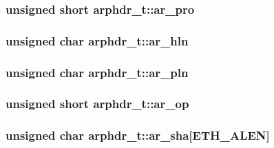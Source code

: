 \hypertarget{structarphdr__t_19ad78d51db8ab6940c913769f8afe81}{
\subsubsection{\setlength{\rightskip}{0pt plus 5cm}unsigned short {\bf arphdr\_\-t::ar\_\-pro}}}
\label{structarphdr__t_19ad78d51db8ab6940c913769f8afe81}


\hypertarget{structarphdr__t_c419667b3f5ced7d4d869b808b179098}{
\subsubsection{\setlength{\rightskip}{0pt plus 5cm}unsigned char {\bf arphdr\_\-t::ar\_\-hln}}}
\label{structarphdr__t_c419667b3f5ced7d4d869b808b179098}


\hypertarget{structarphdr__t_8dec655d6e9394618aeccad297ae619e}{
\subsubsection{\setlength{\rightskip}{0pt plus 5cm}unsigned char {\bf arphdr\_\-t::ar\_\-pln}}}
\label{structarphdr__t_8dec655d6e9394618aeccad297ae619e}


\hypertarget{structarphdr__t_6a409eda40f585b73b8bed3f68709653}{
\subsubsection{\setlength{\rightskip}{0pt plus 5cm}unsigned short {\bf arphdr\_\-t::ar\_\-op}}}
\label{structarphdr__t_6a409eda40f585b73b8bed3f68709653}


\hypertarget{structarphdr__t_643425280b72c91dcb44834c281e5286}{
\subsubsection{\setlength{\rightskip}{0pt plus 5cm}unsigned char {\bf arphdr\_\-t::ar\_\-sha}\mbox{[}ETH\_\-ALEN\mbox{]}}}
\label{structarphdr__t_643425280b72c91dcb44834c281e5286}


